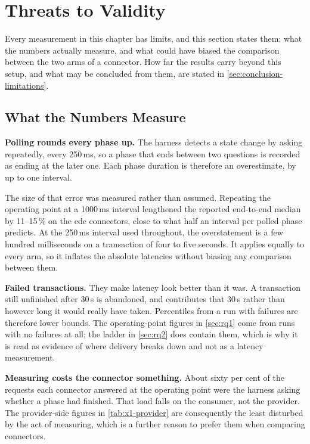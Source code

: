 \section{Threats to Validity}\label{sec:results-validity}


Every measurement in this chapter has limits, and this section states them: what the
numbers actually measure, and what could have biased the comparison between the two arms
of a connector. How far the results carry beyond this setup, and what may be concluded
from them, are stated in \cref{sec:conclusion-limitations}.

\subsection{What the Numbers Measure}\label{subsec:tv-construct}

\textbf{Polling rounds every phase up.} The harness detects a state change by asking
repeatedly, every 250\,ms, so a phase that ends between two questions is recorded as
ending at the later one. Each phase duration is therefore an overestimate, by up to one
interval.

The size of that error was measured rather than assumed. Repeating the operating point at
a 1000\,ms interval lengthened the reported end-to-end median by 11--15\,\% on the
\gls{edc} connectors, close to what half an interval per polled phase predicts. At the
250\,ms interval used throughout, the overstatement is a few hundred milliseconds on a
transaction of four to five seconds. It applies equally to every arm, so it inflates the
absolute latencies without biasing any comparison between them.

\textbf{Failed transactions.} They make latency look better than it was. A transaction still
unfinished after 30\,s is abandoned, and contributes that 30\,s rather than however long
it would really have taken. Percentiles from a run with failures are therefore lower
bounds. The operating-point figures in \cref{sec:rq1} come from runs with no failures at
all; the ladder in \cref{sec:rq2} does contain them, which is why it is read as evidence
of where delivery breaks down and not as a latency measurement.

\textbf{Measuring costs the connector something.} About sixty per cent of the requests
each connector answered at the operating point were the harness asking whether a phase had
finished. That load falls on the consumer, not the provider. The provider-side figures in
\cref{tab:x1-provider} are consequently the least disturbed by the act of measuring, which
is a further reason to prefer them when comparing connectors.

